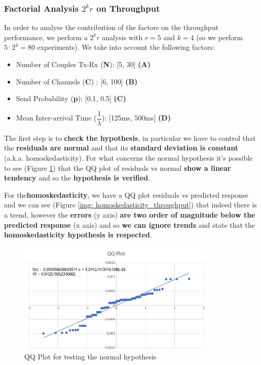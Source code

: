 \subsubsection{Factorial Analysis $2^kr$ on Throughput}
In order to analyse the contribution of the factors on the throughput performance, we perform a $2^kr$ analysis with $r=5$ and $k=4$ (so we perform $5\cdot2^4 = 80$ experiments). We take into account the following factors:
\begin{itemize}
	\item Number of Couples Tx-Rx (\textbf{N}): [5, 30] \textbf{(A)}
	\item Number of Channels (\textbf{C}) : [6, 100] \textbf{(B)}
	\item Send Probability (\textbf{p}): [0.1, 0.5] \textbf{(C)}
	\item Mean Inter-arrival Time ($\dfrac{1}{\lambda}$): [125ms, 500ms] \textbf{(D)}    
\end{itemize}

\noindent The first step is to \textbf{check the hypothesis}, in particular we have to control that the \textbf{residuals are normal} and that its \textbf{standard deviation is constant} (a.k.a. homoskedasticity). For what concerns the normal hypothesis it's possible to see (Figure \ref{img: qqplot_throughput}) that the QQ plot of residuals vs normal \textbf{show a linear tendency} and so the \textbf{hypothesis is verified}.

\noindent For the\textbf{homoskedasticity}, we have a QQ plot residuals vs predicted response and we can see (Figure \ref{img: homoskedasticity_throughput}) that indeed there is a trend, however the \textbf{errors} (y axis) \textbf{are two order of magnitude below the predicted response} (x axis) and so \textbf{we can ignore trends} and state that the \textbf{homoskedasticity hypothesis is respected}.

\begin{figure}[H]
	\centering
	\includegraphics[width=0.85\textwidth]{img/QQplot_2kr_throughput.png}
	\caption{QQ Plot for testing the normal hypothesis}
	\label {img: qqplot_throughput}
\end{figure}

